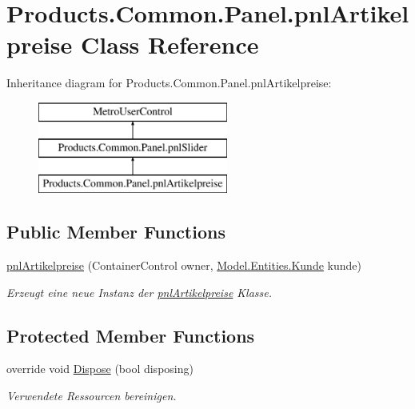 \hypertarget{class_products_1_1_common_1_1_panel_1_1pnl_artikelpreise}{}\section{Products.\+Common.\+Panel.\+pnl\+Artikelpreise Class Reference}
\label{class_products_1_1_common_1_1_panel_1_1pnl_artikelpreise}
Inheritance diagram for Products.\+Common.\+Panel.\+pnl\+Artikelpreise\+:\begin{figure}[H]
\begin{center}
\leavevmode
\includegraphics[height=3.000000cm]{class_products_1_1_common_1_1_panel_1_1pnl_artikelpreise}
\end{center}
\end{figure}
\subsection*{Public Member Functions}
\begin{DoxyCompactItemize}
\item 
\hyperlink{class_products_1_1_common_1_1_panel_1_1pnl_artikelpreise_abd5fd9e05c6092c222e5b0ce38bd86ae}{pnl\+Artikelpreise} (Container\+Control owner, \hyperlink{class_products_1_1_model_1_1_entities_1_1_kunde}{Model.\+Entities.\+Kunde} kunde)
\begin{DoxyCompactList}\small\item\em Erzeugt eine neue Instanz der \hyperlink{class_products_1_1_common_1_1_panel_1_1pnl_artikelpreise}{pnl\+Artikelpreise} Klasse. \end{DoxyCompactList}\end{DoxyCompactItemize}
\subsection*{Protected Member Functions}
\begin{DoxyCompactItemize}
\item 
override void \hyperlink{class_products_1_1_common_1_1_panel_1_1pnl_artikelpreise_abeaad3c6547287a61508a24b5b1a3a11}{Dispose} (bool disposing)
\begin{DoxyCompactList}\small\item\em Verwendete Ressourcen bereinigen. \end{DoxyCompactList}\end{DoxyCompactItemize}
